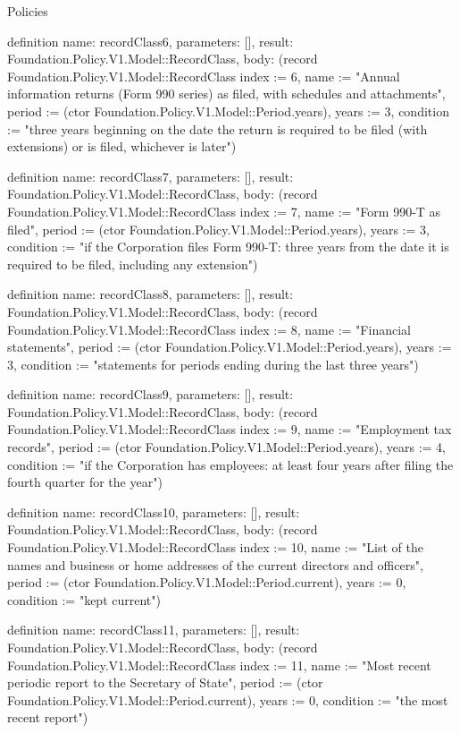 \begin{lexlean}{Policies}
\begin{semanticmodule}
definition{
  name: recordClass6,
  parameters: [],
  result: Foundation.Policy.V1.Model::RecordClass,
  body: (record Foundation.Policy.V1.Model::RecordClass {index := 6, name := "Annual information returns (Form 990 series) as filed, with schedules and attachments", period := (ctor Foundation.Policy.V1.Model::Period.years), years := 3, condition := "three years beginning on the date the return is required to be filed (with extensions) or is filed, whichever is later"})
}

definition{
  name: recordClass7,
  parameters: [],
  result: Foundation.Policy.V1.Model::RecordClass,
  body: (record Foundation.Policy.V1.Model::RecordClass {index := 7, name := "Form 990-T as filed", period := (ctor Foundation.Policy.V1.Model::Period.years), years := 3, condition := "if the Corporation files Form 990-T: three years from the date it is required to be filed, including any extension"})
}

definition{
  name: recordClass8,
  parameters: [],
  result: Foundation.Policy.V1.Model::RecordClass,
  body: (record Foundation.Policy.V1.Model::RecordClass {index := 8, name := "Financial statements", period := (ctor Foundation.Policy.V1.Model::Period.years), years := 3, condition := "statements for periods ending during the last three years"})
}

definition{
  name: recordClass9,
  parameters: [],
  result: Foundation.Policy.V1.Model::RecordClass,
  body: (record Foundation.Policy.V1.Model::RecordClass {index := 9, name := "Employment tax records", period := (ctor Foundation.Policy.V1.Model::Period.years), years := 4, condition := "if the Corporation has employees: at least four years after filing the fourth quarter for the year"})
}

definition{
  name: recordClass10,
  parameters: [],
  result: Foundation.Policy.V1.Model::RecordClass,
  body: (record Foundation.Policy.V1.Model::RecordClass {index := 10, name := "List of the names and business or home addresses of the current directors and officers", period := (ctor Foundation.Policy.V1.Model::Period.current), years := 0, condition := "kept current"})
}

definition{
  name: recordClass11,
  parameters: [],
  result: Foundation.Policy.V1.Model::RecordClass,
  body: (record Foundation.Policy.V1.Model::RecordClass {index := 11, name := "Most recent periodic report to the Secretary of State", period := (ctor Foundation.Policy.V1.Model::Period.current), years := 0, condition := "the most recent report"})
}


\end{semanticmodule}
\end{lexlean}

